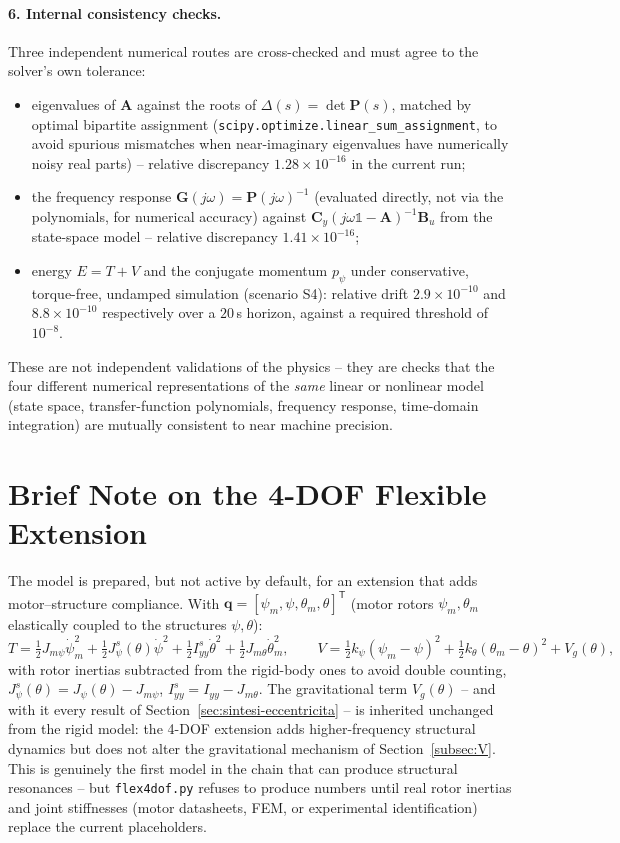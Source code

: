 \documentclass[11pt,a4paper]{article}
\numberwithin{equation}{section}
\newcommand{\bs}[1]{\boldsymbol{#1}}
\newcommand{\T}{^{\mathsf T}}
\begin{document}
\paragraph{6. Internal consistency checks.} Three independent numerical routes are cross-checked and must agree to the solver's own tolerance:
\begin{itemize}
\item eigenvalues of $\bs A$ against the roots of $\Delta(s)=\det\bs P(s)$, matched by optimal bipartite assignment (\texttt{scipy.optimize.linear\_sum\_assignment}, to avoid spurious mismatches when near-imaginary eigenvalues have numerically noisy real parts) -- relative discrepancy $1.28\times10^{-16}$ in the current run;
\item the frequency response $\bs G(j\omega)=\bs P(j\omega)^{-1}$ (evaluated directly, not via the polynomials, for numerical accuracy) against $\bs C_y(j\omega\mathbb 1-\bs A)^{-1}\bs B_u$ from the state-space model -- relative discrepancy $1.41\times10^{-16}$;
\item energy $E=T+V$ and the conjugate momentum $p_\psi$ under conservative, torque-free, undamped simulation (scenario S4): relative drift $2.9\times10^{-10}$ and $8.8\times10^{-10}$ respectively over a $20$\,s horizon, against a required threshold of $10^{-8}$.
\end{itemize}
These are not independent validations of the physics -- they are checks that the four different numerical representations of the \emph{same} linear or nonlinear model (state space, transfer-function polynomials, frequency response, time-domain integration) are mutually consistent to near machine precision.

\section{Brief Note on the 4-DOF Flexible Extension}
\label{sec:flex}

The model is prepared, but not active by default, for an extension that adds motor--structure compliance. With $\bs q=[\psi_m,\psi,\theta_m,\theta]\T$ (motor rotors $\psi_m,\theta_m$ elastically coupled to the structures $\psi,\theta$):
\begin{equation}
T = \tfrac12 J_{m\psi}\dot\psi_m^2 + \tfrac12 J_\psi^{s}(\theta)\dot\psi^2 + \tfrac12 I_{yy}^{s}\dot\theta^2 + \tfrac12 J_{m\theta}\dot\theta_m^2 ,
\qquad
V = \tfrac12 k_\psi(\psi_m-\psi)^2 + \tfrac12 k_\theta(\theta_m-\theta)^2 + V_g(\theta),
\end{equation}
with rotor inertias subtracted from the rigid-body ones to avoid double counting, $J_\psi^{s}(\theta)=J_\psi(\theta)-J_{m\psi}$, $I_{yy}^{s}=I_{yy}-J_{m\theta}$. The gravitational term $V_g(\theta)$ -- and with it every result of Section~\ref{sec:sintesi-eccentricita} -- is inherited unchanged from the rigid model: the 4-DOF extension adds higher-frequency structural dynamics but does not alter the gravitational mechanism of Section~\ref{subsec:V}. This is genuinely the first model in the chain that can produce structural resonances -- but \texttt{flex4dof.py} refuses to produce numbers until real rotor inertias and joint stiffnesses (motor datasheets, FEM, or experimental identification) replace the current placeholders.
\end{document}
